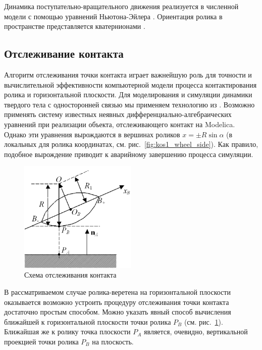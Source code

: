 \documentclass[12pt]{article}
\begin{document}
Динамика поступательно-вращательного движения реализуется в численной модели с помощью уравнений Ньютона-Эйлера \cite{kos6}. Ориентация ролика в пространстве представляется кватернионами \cite{kos7}.\\

\subsection{Отслеживание контакта}

Алгоритм отслеживания точки контакта играет важнейшую роль для точности и вычислительной эффективности компьютерной модели процесса контактирования ролика и горизонтальной плоскости. Для моделирования и симуляции динамики твердого тела с односторонней связью мы применяем технологию из \cite{kos8}. Возможно применять систему известных неявных дифферен\-циально\--алгебраических уравнений при реализации объекта, отслеживающего контакт на Modelica. Однако эти уравнения вырождаются в вершинах роликов $x = \pm R\sin\alpha$ (в локальных для ролика координатах, см. рис.~\ref{fig:kos1_wheel_side}). Как правило, подобное вырождение приводит к аварийному завершению процесса симуляции.\\

\begin{figure}[h]
    \centering
    \includegraphics[width=0.5\textwidth]{content/parts/3_friction/diploma/img/art/kos4_roller_contact.png}
    \caption{Схема отслеживания контакта}
    \label{fig:kos4_roller_contact}
\end{figure}

В рассматриваемом случае ролика-веретена на горизонтальной плоскости оказывается возможно устроить процедуру отслеживания точки контакта достаточно простым способом. Можно указать явный способ вычисления ближайшей к горизонтальной плоскости точки ролика $P_B$ (см. рис.~\ref{fig:kos4_roller_contact}). Ближайшая же к ролику точка плоскости $P_A$ является, очевидно, вертикальной проекцией точки ролика $P_B$ на плоскость.\\
\end{document}
